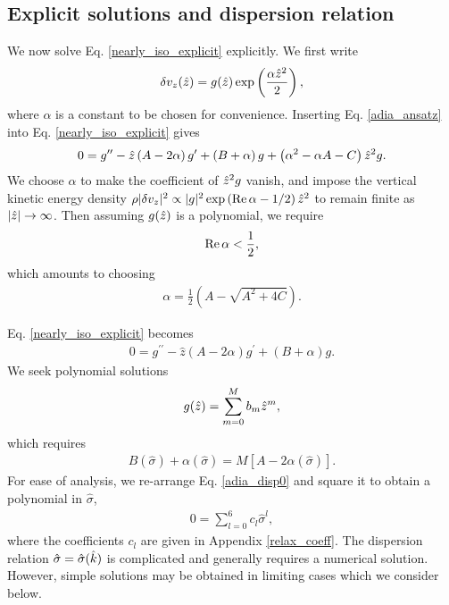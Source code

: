 \subsection{Explicit solutions and dispersion relation}\label{disp_relax}
We now solve Eq. \ref{nearly_iso_explicit} explicitly. We first write  
\begin{align}
  \delta v_z(\hat{z}) =
  g(\hat{z})\exp\left(\frac{\alpha\hat{z}^2}{2}\right), \label{adia_ansatz}
\end{align}
where $\alpha$ is a constant to be chosen for convenience. Inserting
Eq. \ref{adia_ansatz} into Eq. \ref{nearly_iso_explicit} gives
\begin{align}
  0 = g^{\prime\prime} - \hat{z}\left(A - 2\alpha\right)g^\prime + \left(B +
    \alpha\right)g
  +\left(\alpha^2 - \alpha A - C\right)\hat{z}^2 g.
\end{align}
We choose $\alpha$ to make the coefficient of $\hat{z}^2g$
vanish, and impose the vertical kinetic energy density
$\rho|\delta v_z|^2\propto |g|^2 \exp{\left(\operatorname{Re}\alpha -
    1/2\right)\hat{z}^2}$ to remain finite as $|\hat{z}|\to\infty$. 
Then assuming $g(\hat{z})$ is a polynomial, we require  
\begin{align}
  \operatorname{Re}\alpha < \frac{1}{2}, 
\end{align}
which amounts to choosing 
\begin{align}
  \alpha = \frac{1}{2}\left(A - \sqrt{A^2 + 4C}\right).  
\end{align} 


Eq. \ref{nearly_iso_explicit} becomes 
\begin{align}
  0 = g^{\prime\prime} - \hat{z}\left(A - 2\alpha\right)g^\prime +
  \left(B + \alpha\right)g.
\end{align}
We seek polynomial solutions 
\begin{align}
  g(\hat{z}) = \sum_{m=0}^M b_m \hat{z}^m,
\end{align}
which requires
\begin{align}
  B(\hat{\sigma}) + \alpha(\hat{\sigma}) =
  M\left[A-2\alpha(\hat{\sigma})\right].\label{adia_disp0} 
\end{align}
For ease of analysis, we re-arrange Eq. \ref{adia_disp0} and square it
to obtain a polynomial in $\hat{\sigma}$,  
\begin{align}
  0 = \sum_{l=0}^{6}c_l\hat{\sigma}^l,\label{relax_disp}
\end{align}
where the coefficients $c_l$ are given in Appendix \ref{relax_coeff}.
The dispersion relation $\hat{\sigma}=\hat{\sigma}(\hat{k})$ is
complicated and generally requires a numerical solution. However,
simple solutions may be obtained in limiting cases which we consider
below.  


